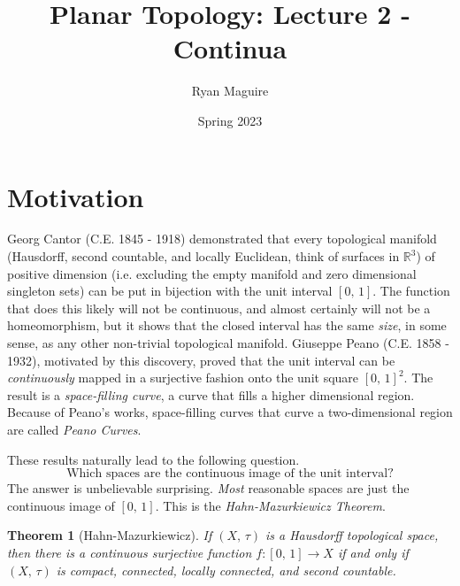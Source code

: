 \documentclass{article}
\title{Planar Topology: Lecture 2 - Continua}
\author{Ryan Maguire}
\date{Spring 2023}
\theoremstyle{plain}
\newtheorem{theorem}{Theorem}[section]
\theoremstyle{normal}
\begin{document}
    \maketitle
    \tableofcontents
    \listoffigures
    \section{Motivation}
        Georg Cantor (C.E. 1845 - 1918)
        demonstrated that every topological
        manifold (Hausdorff, second countable, and locally Euclidean, think of
        surfaces in $\mathbb{R}^{3}$) of positive dimension (i.e. excluding
        the empty manifold and zero dimensional singleton sets) can be put in
        bijection with the unit interval $[0,\,1]$. The function that does this
        likely will not be continuous, and almost certainly will not be a
        homeomorphism, but it shows that the closed interval has the same
        \textit{size}, in some sense, as any other non-trivial
        topological manifold.
        Giuseppe Peano (C.E. 1858 - 1932), motivated by
        this discovery, proved that the unit interval can be
        \textit{continuously} mapped in a surjective fashion onto the unit
        square $[0,\,1]^{2}$. The result is a
        \textit{space-filling curve}, a curve
        that fills a higher dimensional region. Because of Peano's works,
        space-filling curves that curve a two-dimensional region are called
        \textit{Peano Curves}.
        \par\hfill\par
        These results naturally lead to the following question.
        \begin{equation}
            \textrm{Which spaces are the continuous image of the unit interval?}
        \end{equation}
        The answer is unbelievable surprising. \textit{Most} reasonable spaces
        are just the continuous image of $[0,\,1]$. This is the
        \textit{Hahn-Mazurkiewicz Theorem}.
        \begin{theorem}[Hahn-Mazurkiewicz]
            If $(X,\,\tau)$ is a Hausdorff topological space, then there is a
            continuous surjective function $f:[0,\,1]\rightarrow{X}$ if and
            only if $(X,\,\tau)$ is compact, connected, locally connected, and
            second countable.
        \end{theorem}
\end{document}
